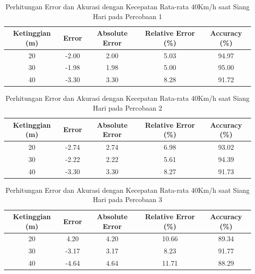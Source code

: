 \begin{table}[H]
\centering
	\caption{Perhitungan Error dan Akurasi dengan Kecepatan Rata-rata 40Km/h saat Siang Hari pada Percobaan 1}
	\label{table:error_accuracy_per1_40km/h_siang}
	\begin{tabular}{|c|c|c|c|c|}
	\hline
	\textbf{Ketinggian (m)} & \textbf{Error} & \textbf{Absolute Error} & \textbf{Relative Error (\%)} & \textbf{Accuracy (\%)} \\
	\hline
	20 & -2.00 & 2.00 & 5.03 & 94.97 \\
	30 & -1.98 & 1.98 & 5.00 & 95.00 \\
	40 & -3.30 & 3.30 & 8.28 & 91.72 \\
	\hline
	\end{tabular}
\end{table}
\vspace{-10pt}
\begin{table}[H]
\centering
	\caption{Perhitungan Error dan Akurasi dengan Kecepatan Rata-rata 40Km/h saat Siang Hari pada Percobaan 2}
	\label{table:error_accuracy_per2_40km/h_siang}
	\begin{tabular}{|c|c|c|c|c|}
	\hline
	\textbf{Ketinggian (m)} & \textbf{Error} & \textbf{Absolute Error} & \textbf{Relative Error (\%)} & \textbf{Accuracy (\%)} \\
	\hline
	20 & -2.74 & 2.74 & 6.98 & 93.02 \\
	30 & -2.22 & 2.22 & 5.61 & 94.39 \\
	40 & -3.30 & 3.30 & 8.27 & 91.73 \\
	\hline
	\end{tabular}
\end{table}
\vspace{-10pt}
\begin{table}[H]
\centering
	\caption{Perhitungan Error dan Akurasi dengan Kecepatan Rata-rata 40Km/h saat Siang Hari pada Percobaan 3}
	\label{table:error_accuracy_per3_40km/h_siang}
	\begin{tabular}{|c|c|c|c|c|}
	\hline
	\textbf{Ketinggian (m)} & \textbf{Error} & \textbf{Absolute Error} & \textbf{Relative Error (\%)} & \textbf{Accuracy (\%)} \\
	\hline
	20 & 4.20 & 4.20 & 10.66 & 89.34 \\
	30 & -3.17 & 3.17 & 8.23 & 91.77 \\
	40 & -4.64 & 4.64 & 11.71 & 88.29 \\
	\hline
	\end{tabular}
\end{table}
\vspace{-10pt}
